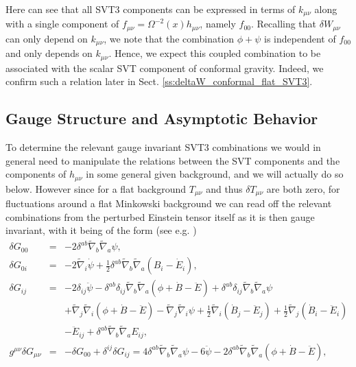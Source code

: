 %
Here can see that all SVT3 components can be expressed in terms of $k_{\mu\nu}$ along with a single component of $f_{\mu\nu}=\Omega^{-2}(x)h_{\mu\nu}$, namely $f_{00}$.  Recalling that $\delta W_{\mu\nu}$ can only depend on $k_{\mu\nu}$, we note that the combination $\phi+\psi$ is independent of $f_{00}$ and only depends on $k_{\mu\nu}$. Hence, we expect this coupled combination to be associated with the scalar SVT component of conformal gravity. Indeed, we confirm such a relation later in Sect. \ref{ss:deltaW_conformal_flat_SVT3}.

\subsection{Gauge Structure and Asymptotic Behavior}
\label{ss:gauge_struct_svt3}
To determine  the relevant gauge invariant SVT3 combinations we would in general need to manipulate the relations between the SVT components and the components of $h_{\mu\nu}$ in some general given background, and we will actually do so below. However since for a flat background $T_{\mu\nu}$ and thus $\delta T_{\mu\nu}$ are both zero, for fluctuations around a flat Minkowski background  we can read off the relevant combinations from the perturbed Einstein tensor itself as it is then gauge invariant, with it being of the form   (see e.g. \cite{amarasinghe_2019})
%
\begin{eqnarray}
\delta G_{00}&=&- 2 \delta^{ab} \tilde{\nabla}_{b}\tilde{\nabla}_{a}\psi,
\nonumber\\
\delta G_{0i}&=&- 2 \tilde{\nabla}_{i}\dot{\psi}+ \tfrac{1}{2} \delta^{ab} \tilde{\nabla}_{b}\tilde{\nabla}_{a}(B_{i} -  \dot{E}_{i}),
\nonumber\\
\delta G_{ij}&=&- 2 \delta_{ij} \ddot{\psi} -  \delta^{ab} \delta_{ij} \tilde{\nabla}_{b}\tilde{\nabla}_{a}(\phi+\dot{B}  -\ddot{E})+ \delta^{ab} \delta_{ij} \tilde{\nabla}_{b}\tilde{\nabla}_{a}\psi 
	\nonumber\\
&&
+ \tilde{\nabla}_{j}\tilde{\nabla}_{i}(\phi+\dot{B} -  \ddot{E})
-  \tilde{\nabla}_{j}\tilde{\nabla}_{i}\psi
+ \tfrac{1}{2} \tilde{\nabla}_{i}(\dot{B}_{j} - \ddot{E}_{j}) + \tfrac{1}{2} \tilde{\nabla}_{j}(\dot{B}_{i}  
- \ddot{E}_{i})
\nonumber\\
&&- \ddot{E}_{ij} + \delta^{ab} \tilde{\nabla}_{b}\tilde{\nabla}_{a}E_{ij},
\nonumber\\
g^{\mu\nu}\delta G_{\mu\nu}&=&-\delta G_{00}+\delta^{ij}\delta G_{ij}=4 \delta^{ab} \tilde{\nabla}_{b}\tilde{\nabla}_{a}\psi -6\ddot{\psi}-2 \delta^{ab} \tilde{\nabla}_{b}\tilde{\nabla}_{a}(\phi+\dot{B}  -\ddot{E}),
\nonumber\\
\label{2.3}
\end{eqnarray}

